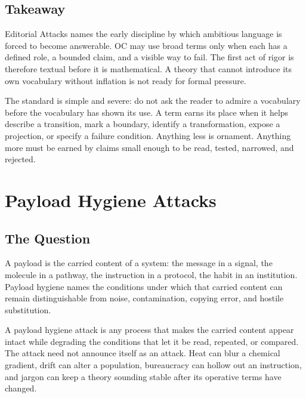 \documentclass[11pt,a4paper,openany]{book}
\begin{document}
\subsection{Takeaway}
Editorial Attacks names the early discipline by which ambitious language is forced to become answerable. OC may use broad terms only when each has a defined role, a bounded claim, and a visible way to fail. The first act of rigor is therefore textual before it is mathematical. A theory that cannot introduce its own vocabulary without inflation is not ready for formal pressure. \cite{landau_stat_physics,prigogine_dissipative}\par
The standard is simple and severe: do not ask the reader to admire a vocabulary before the vocabulary has shown its use. A term earns its place when it helps describe a transition, mark a boundary, identify a transformation, expose a projection, or specify a failure condition. Anything less is ornament. Anything more must be earned by claims small enough to be read, tested, narrowed, and rejected.\par
\section{Payload Hygiene Attacks}
\subsection{The Question}
A payload is the carried content of a system: the message in a signal, the molecule in a pathway, the instruction in a protocol, the habit in an institution. Payload hygiene names the conditions under which that carried content can remain distinguishable from noise, contamination, copying error, and hostile substitution. \cite{prigogine_dissipative,haken_synergetics}\par
A payload hygiene attack is any process that makes the carried content appear intact while degrading the conditions that let it be read, repeated, or compared. The attack need not announce itself as an attack. Heat can blur a chemical gradient, drift can alter a population, bureaucracy can hollow out an instruction, and jargon can keep a theory sounding stable after its operative terms have changed.\par
\end{document}

